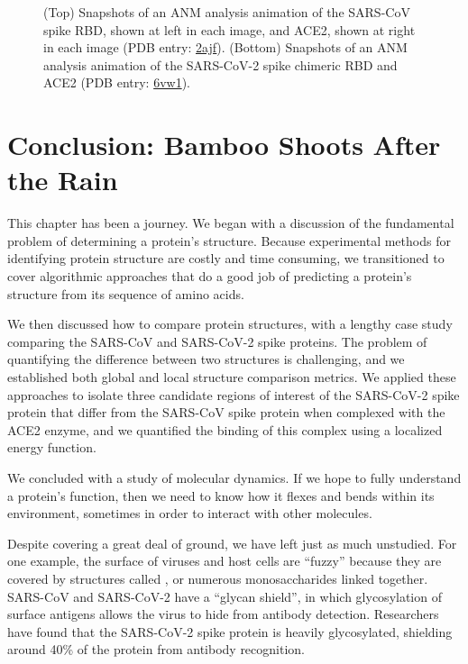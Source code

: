 \begin{figure}[h]
\begin{tabular}{c c c}
	\end{tabular}
	\caption{(Top) Snapshots of an ANM analysis animation of the SARS-CoV spike RBD, shown at left in each image, and ACE2, shown at right in each image (PDB entry: \href{https://www.rcsb.org/structure/2ajf}{2ajf}). (Bottom) Snapshots of an ANM analysis animation of the SARS-CoV-2 spike chimeric RBD and ACE2 (PDB entry: \href{https://www.rcsb.org/structure/6vw1}{6vw1}).}
	\label{fig:coronavirus_anm_animation}
\end{figure}

\section{Conclusion: Bamboo Shoots After the Rain}

This chapter has been a journey. We began with a discussion of the fundamental problem of determining a protein's structure. Because experimental methods for identifying protein structure are costly and time consuming, we transitioned to cover algorithmic approaches that do a good job of predicting a protein's structure from its sequence of amino acids.

We then discussed how to compare protein structures, with a lengthy case study comparing the SARS-CoV and SARS-CoV-2 spike proteins. The problem of quantifying the difference between two structures is challenging, and we established both global and local structure comparison metrics. We applied these approaches to isolate three candidate regions of interest of the SARS-CoV-2 spike protein that differ from the SARS-CoV spike protein when complexed with the ACE2 enzyme, and we quantified the binding of this complex using a localized energy function.

We concluded with a study of molecular dynamics. If we hope to fully understand a protein's function, then we need to know how it flexes and bends within its environment, sometimes in order to interact with other molecules.

Despite covering a great deal of ground, we have left just as much unstudied. For one example, the surface of viruses and host cells are ``fuzzy'' because they are covered by structures called , or numerous monosaccharides linked together. SARS-CoV and SARS-CoV-2 have a “glycan shield”, in which glycosylation of surface antigens allows the virus to hide from antibody detection. Researchers have found that the SARS-CoV-2 spike protein is heavily glycosylated, shielding around 40\% of the protein from antibody recognition.


